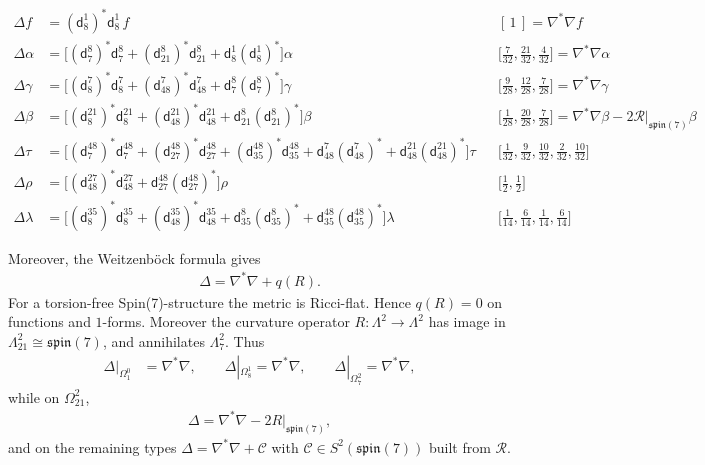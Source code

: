 \documentclass[10pt,a4paper,reqno]{article}
\theoremstyle{definition}
\numberwithin{equation}{section}
\newcommand{\R}{\mathcal{R}}
\newcommand{\sff}{\mathfrak{spin}(7)}
\newcommand{\ddtwo}[2]{\mathsf d^{#1}_{#2}}          %
\newcommand{\ddtwos}[2]{(\mathsf d^{#1}_{#2})^{\ast}} %
\begin{document}
\begin{table}[htp!]
\centering
\[
\begin{aligned}
\Delta f&=\ddtwos{1}{8}\ddtwo{1}{8}\,f && [\,1\,]=\nabla^\ast\nabla f\\[3pt]
\Delta\alpha&=\big[\ddtwos{8}{7}\ddtwo{8}{7}+\ddtwos{8}{21}\ddtwo{8}{21}+\ddtwo{1}{8}\ddtwos{1}{8}\big]\alpha
&&\big[\tfrac{7}{32},\tfrac{21}{32},\tfrac{4}{32}\big]=\nabla^\ast\nabla\alpha\\[3pt]
\Delta\gamma&=\big[\ddtwos{7}{8}\ddtwo{7}{8}+\ddtwos{7}{48}\ddtwo{7}{48}+\ddtwo{8}{7}\ddtwos{8}{7}\big]\gamma
&&\big[\tfrac{9}{28},\tfrac{12}{28},\tfrac{7}{28}\big]=\nabla^\ast\nabla\gamma\\[3pt]
\Delta\beta&=\big[\ddtwos{21}{8}\ddtwo{21}{8}+\ddtwos{21}{48}\ddtwo{21}{48}+\ddtwo{8}{21}\ddtwos{8}{21}\big]\beta
&&\big[\tfrac{1}{28},\tfrac{20}{28},\tfrac{7}{28}\big]=\nabla^\ast\nabla\beta-2\R|_{\sff}\beta\\[3pt]
\Delta\tau&=\big[\ddtwos{48}{7}\ddtwo{48}{7}+\ddtwos{48}{27}\ddtwo{48}{27}+\ddtwos{48}{35}\ddtwo{48}{35}
             +\ddtwo{7}{48}\ddtwos{7}{48}+\ddtwo{21}{48}\ddtwos{21}{48}\big]\tau
&&\big[\tfrac{1}{32},\tfrac{9}{32},\tfrac{10}{32},\tfrac{2}{32},\tfrac{10}{32}\big]\\[3pt]
\Delta\rho&=\big[\ddtwos{27}{48}\ddtwo{27}{48}+\ddtwo{48}{27}\ddtwos{48}{27}\big]\rho
&&\big[\tfrac12,\tfrac12\big]\\[3pt]
\Delta\lambda&=\big[\ddtwos{35}{8}\ddtwo{35}{8}+\ddtwos{35}{48}\ddtwo{35}{48}
               +\ddtwo{8}{35}\ddtwos{8}{35}+\ddtwo{48}{35}\ddtwos{48}{35}\big]\lambda
&&\big[\tfrac{1}{14},\tfrac{6}{14},\tfrac{1}{14},\tfrac{6}{14}\big]
\end{aligned}
\]
\caption{The Hodge Laplacian with symbol weights, $f\in \Omega^0, \alpha\in\Omega^1_8,\ \gamma\in\Omega^2_7,\ \beta\in\Omega^2_{21},\ \tau\in\Omega^3_{48},\ \rho\in\Omega^4_{27},\ \lambda\in\Omega^4_{35}$}
\label{table:d3} 
\end{table}

\noindent
Moreover, the Weitzenböck formula gives
\begin{align*}
    \Delta=\nabla^*\nabla+q(R).
\end{align*}
For a torsion-free Spin(7)-structure the metric is Ricci-flat. Hence
$q(R)=0$ on functions and $1$-forms. Moreover the curvature operator
$R:\Lambda^2\to\Lambda^2$ has image in
$\Lambda^2_{21}\cong\mathfrak{spin}(7)$, and annihilates
$\Lambda^2_7$. Thus
\begin{align*}
    \Delta|_{\Omega^0_1}&=\nabla^*\nabla,
\qquad
\Delta|_{\Omega^1_8}=\nabla^*\nabla,
\qquad
\Delta|_{\Omega^2_7}=\nabla^*\nabla,
\end{align*}
while on \(\Omega^2_{21}\),
\begin{align*}
    \Delta=\nabla^*\nabla-2R|_{\mathfrak{spin}(7)},
\end{align*}and on the remaining types $\Delta=\nabla^\ast\nabla+\mathcal C$ with
$\mathcal C\in S^2(\sff)$ built from $\R$. 
\end{document}
